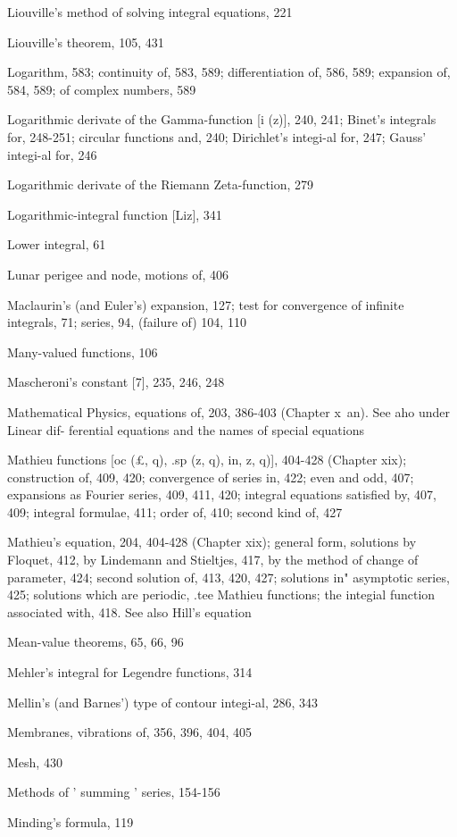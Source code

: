 Liouville's method of solving integral equations, 221

Liouville's theorem, 105, 431

Logarithm, 583; continuity of, 583, 589; differentiation of, 586, 589; expansion of, 584, 589;
of complex numbers, 589

Logarithmic derivate of the Gamma-function [i (z)], 240, 241; Binet's integrals for, 248-251;
circular functions and, 240; Dirichlet's integi-al for, 247; Gauss' integi-al for, 246

Logarithmic derivate of the Riemann Zeta-function, 279

Logarithmic-integral function [Liz], 341

Lower integral, 61

Lunar perigee and node, motions of, 406

Maclaurin's (and Euler's) expansion, 127; test for convergence of infinite integrals, 71; series,
94, (failure of) 104, 110

Many-valued functions, 106

Mascheroni's constant [7], 235, 246, 248

Mathematical Physics, equations of, 203, 386-403 (Chapter x\ an). See aho under Linear dif-
ferential equations and the names of special equations

Mathieu functions [oc (£, q), .sp (z, q), in,  z, q)], 404-428 (Chapter xix); construction of, 409,
420; convergence of series in, 422; even and odd, 407; expansions as Fourier series, 409,
411, 420; integral equations satisfied by, 407, 409; integral formulae, 411; order of, 410;
second kind of, 427

Mathieu's equation, 204, 404-428 (Chapter xix); general form, solutions by Floquet, 412, by
Lindemann and Stieltjes, 417, by the method of change of parameter, 424; second solution
of, 413, 420, 427; solutions in" asymptotic series, 425; solutions which are periodic, .tee
Mathieu functions; the integial function associated with, 418. See also Hill's equation

Mean-value theorems, 65, 66, 96

Mehler's integral for Legendre functions, 314

Mellin's (and Barnes') type of contour integi-al, 286, 343

Membranes, vibrations of, 356, 396, 404, 405

Mesh, 430

Methods of ' summing ' series, 154-156

Minding's formula, 119

